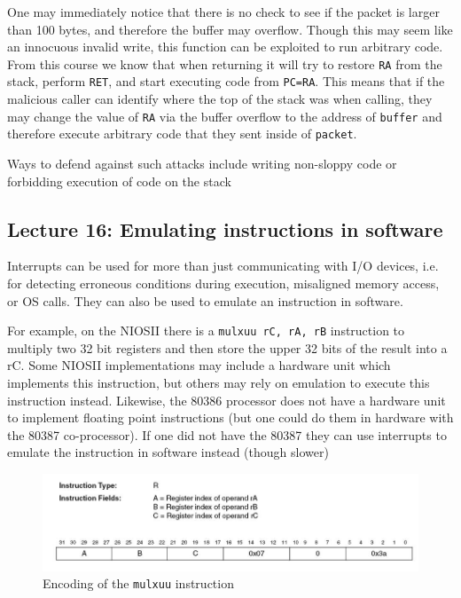 \documentclass[../notes.tex]{subfiles}
\begin{document}
One may immediately notice that there is no check to see if the packet is larger than 100 bytes, and therefore the buffer may overflow.
Though this may seem like an innocuous invalid write, this function can be exploited to run arbitrary code.
From this course we know that when returning it will try to restore \texttt{RA} from the stack, perform \texttt{RET}, and start executing code from \texttt{PC=RA}.
This means that if the malicious caller can identify where the top of the stack was when calling, they may change the value of \texttt{RA} via the buffer overflow to the address of \texttt{buffer} and therefore execute arbitrary code that they sent inside of \texttt{packet}.


Ways to defend against such attacks include writing non-sloppy code or forbidding execution of code on the stack


\subsection{Lecture 16: Emulating instructions in software}

Interrupts can be used for more than just communicating with I/O devices, i.e. for detecting erroneous conditions during execution, misaligned memory access, or OS calls.
They can also be used to emulate an instruction in software.

For example, on the NIOSII there is a \texttt{mulxuu rC, rA, rB} instruction to multiply two 32 bit registers and then store the upper 32 bits of the result into a rC.
Some NIOSII implementations may include a hardware unit which implements this instruction, but others may rely on emulation to execute this instruction instead.
Likewise, the 80386 processor does not have a hardware unit to implement floating point instructions (but one could do them in hardware with the 80387 co-processor). If one did not have the 80387 they can use interrupts to emulate the instruction in software instead (though slower)




\begin{figure}[H]
	\centering
	\includegraphics[width=0.8\linewidth]{img/image_2022-11-03-14-27-58.png}
	\caption{Encoding of the \texttt{mulxuu} instruction}
\end{figure}
\end{document}
